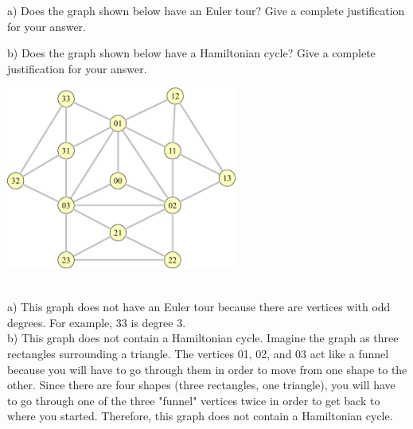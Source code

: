 \documentclass{article}
\begin{document}
\vspace{0.15in}
\newpage
\begin{problem}

a) Does the graph shown below have an Euler tour? Give a complete justification for your answer.

b) Does the graph shown below have a Hamiltonian cycle? Give a complete justification for your answer.


	\begin{center}
	\includegraphics[width = 3in]{Ham_graph.pdf}
	\end{center}

\end{problem}

\begin{solution}\\	
	a) This graph does not have an Euler tour because there are vertices with odd degrees. For example, 33 is degree 3.
	\\
	b) This graph does not contain a Hamiltonian cycle. Imagine the graph as three rectangles surrounding a triangle. The vertices 01, 02, and 03 act like a funnel because you will have to go through them in order to move from one shape to the other. Since there are four shapes (three rectangles, one triangle), you will have to go through one of the three "funnel" vertices twice in order to get back to where you started. Therefore, this graph does not contain a Hamiltonian cycle.
	\\
\end{solution}


\newpage
\end{document}
